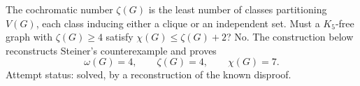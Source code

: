 The cochromatic number \(\zeta(G)\) is the least number of classes partitioning \(V(G)\), each class inducing either a clique or an independent set. Must a \(K_5\)-free graph with \(\zeta(G)\geq4\) satisfy \(\chi(G)\leq\zeta(G)+2\)?
No. The construction below reconstructs Steiner's counterexample and proves
\[
\omega(G)=4,\qquad \zeta(G)=4,\qquad \chi(G)=7.
\]
Attempt status: solved, by a reconstruction of the known disproof.
